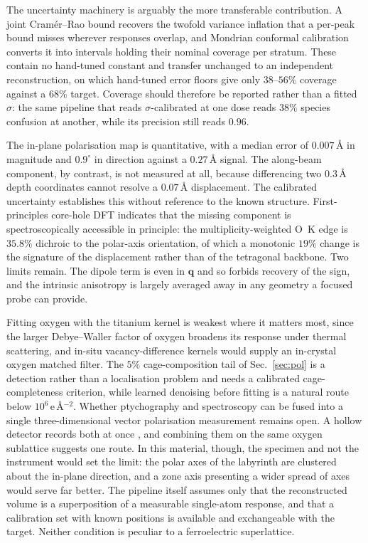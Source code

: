 \documentclass[aps,prb,twocolumn,superscriptaddress,floatfix,nofootinbib]{revtex4-2}
\begin{document}
The uncertainty machinery is arguably the more transferable contribution. A joint Cram\'er--Rao bound recovers the twofold variance inflation that a per-peak bound misses wherever responses overlap, and Mondrian conformal calibration converts it into intervals holding their nominal coverage per stratum. These contain no hand-tuned constant and transfer unchanged to an independent reconstruction, on which hand-tuned error floors give only $38$--$56\%$ coverage against a $68\%$ target. Coverage should therefore be reported rather than a fitted $\sigma$: the same pipeline that reads $\sigma$-calibrated at one dose reads $38\%$ species confusion at another, while its precision still reads $0.96$.

The in-plane polarisation map is quantitative, with a median error of $0.007$\,\AA{} in magnitude and $0.9^\circ$ in direction against a $0.27$\,\AA{} signal. The along-beam component, by contrast, is not measured at all, because differencing two $0.3$\,\AA{} depth coordinates cannot resolve a $0.07$\,\AA{} displacement. The calibrated uncertainty establishes this without reference to the known structure. First-principles core-hole DFT indicates that the missing component is spectroscopically accessible in principle: the multiplicity-weighted O~K edge is $35.8\%$ dichroic to the polar-axis orientation, of which a monotonic $19\%$ change is the signature of the displacement rather than of the tetragonal backbone. Two limits remain. The dipole term is even in $\mathbf{q}$ and so forbids recovery of the sign, and the intrinsic anisotropy is largely averaged away in any geometry a focused probe can provide.

Fitting oxygen with the titanium kernel is weakest where it matters most, since the larger Debye--Waller factor of oxygen broadens its response under thermal scattering, and in-situ vacancy-difference kernels would supply an in-crystal oxygen matched filter. The $5\%$ cage-composition tail of Sec.~\ref{sec:pol} is a detection rather than a localisation problem and needs a calibrated cage-completeness criterion, while learned denoising before fitting \citep{Wu2026} is a natural route below $10^{6}$\,e\,\AA$^{-2}$. Whether ptychography and spectroscopy can be fused into a single three-dimensional vector polarisation measurement remains open. A hollow detector records both at once \citep{LeiWang2026}, and combining them on the same oxygen sublattice \citep{Dong2024} suggests one route. In this material, though, the specimen and not the instrument would set the limit: the polar axes of the labyrinth are clustered about the in-plane direction, and a zone axis presenting a wider spread of axes would serve far better. The pipeline itself assumes only that the reconstructed volume is a superposition of a measurable single-atom response, and that a calibration set with known positions is available and exchangeable with the target. Neither condition is peculiar to a ferroelectric superlattice.
\end{document}
